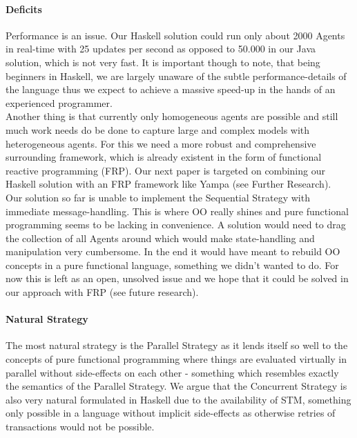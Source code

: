 \paragraph{Deficits}
Performance is an issue. Our Haskell solution could run only about 2000 Agents in real-time with 25 updates per second as opposed to 50.000 in our Java solution, which is not very fast. It is important though to note, that being beginners in Haskell, we are largely unaware of the subtle performance-details of the language thus we expect to achieve a massive speed-up in the hands of an experienced programmer. \\

Another thing is that currently only homogeneous agents are possible and still much work needs do be done to capture large and complex models with heterogeneous agents. For this we need a more robust and comprehensive surrounding framework, which is already existent in the form of functional reactive programming (FRP). Our next paper is targeted on combining our Haskell solution with an FRP framework like Yampa (see Further Research). \\ 

Our solution so far is unable to implement the Sequential Strategy with immediate message-handling. This is where OO really shines and pure functional programming seems to be lacking in convenience. A solution would need to drag the collection of all Agents around which would make state-handling and manipulation very cumbersome. In the end it would have meant to rebuild OO concepts in a pure functional language, something we didn't wanted to do. For now this is left as an open, unsolved issue and we hope that it could be solved in our approach with FRP (see future research).

\paragraph{Natural Strategy}
The most natural strategy is the Parallel Strategy as it lends itself so well to the concepts of pure functional programming where things are evaluated virtually in parallel without side-effects on each other - something which resembles exactly the semantics of the Parallel Strategy. We argue that the Concurrent Strategy is also very natural formulated in Haskell due to the availability of STM, something only possible in a language without implicit side-effects as otherwise retries of transactions would not be possible.



